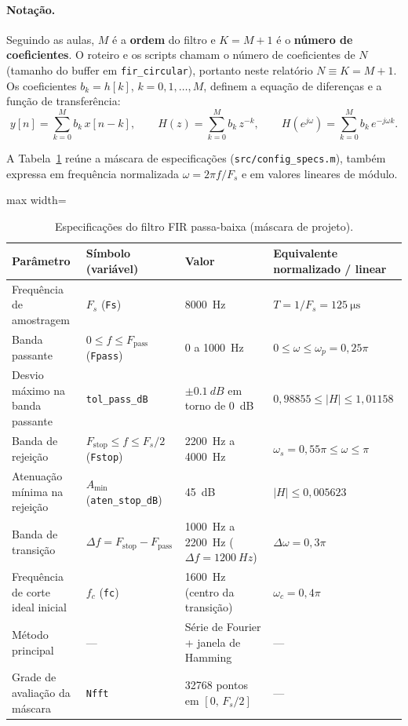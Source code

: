 \documentclass[11pt,a4paper]{article}
\begin{document}
\paragraph{Notação.} Seguindo as aulas, $M$ é a \textbf{ordem} do filtro e $K = M + 1$ é o \textbf{número de coeficientes}. O roteiro e os scripts chamam o número de coeficientes de $N$ (tamanho do buffer em \texttt{fir\_circular}), portanto neste relatório $N \equiv K = M + 1$. Os coeficientes $b_k = h[k]$, $k = 0, 1, \dots, M$, definem a equação de diferenças e a função de transferência:
\begin{equation}
    y[n] = \sum_{k=0}^{M} b_k\, x[n-k], \qquad H(z) = \sum_{k=0}^{M} b_k\, z^{-k}, \qquad H(e^{j\omega}) = \sum_{k=0}^{M} b_k\, e^{-j\omega k}.
    \label{eq:fir}
\end{equation}

A Tabela~\ref{tab:especificacoes} reúne a máscara de especificações (\texttt{src/config\_specs.m}), também expressa em frequência normalizada $\omega = 2\pi f / F_s$ e em valores lineares de módulo.

\begin{table}[H]
    \centering
    \caption{Especificações do filtro FIR passa-baixa (máscara de projeto).}
    \label{tab:especificacoes}
    \small
    \begin{adjustbox}{max width=\textwidth}
    \begin{tabular}{@{}llll@{}}
        \toprule
        \textbf{Parâmetro} & \textbf{Símbolo (variável)} & \textbf{Valor} & \textbf{Equivalente normalizado / linear} \\
        \midrule
        Frequência de amostragem & $F_s$ (\texttt{Fs}) & \SI{8000}{Hz} & $T = 1/F_s = \SI{125}{\micro\second}$ \\
        Banda passante & $0 \le f \le F_{\text{pass}}$ (\texttt{Fpass}) & 0 a \SI{1000}{Hz} & $0 \le \omega \le \omega_p = 0,25\pi$ \\
        Desvio máximo na banda passante & \texttt{tol\_pass\_dB} & $\pm\SI{0,1}{dB}$ em torno de \SI{0}{dB} & $0,98855 \le |H| \le 1,01158$ \\
        Banda de rejeição & $F_{\text{stop}} \le f \le F_s/2$ (\texttt{Fstop}) & \SI{2200}{Hz} a \SI{4000}{Hz} & $\omega_s = 0,55\pi \le \omega \le \pi$ \\
        Atenuação mínima na rejeição & $A_{\min}$ (\texttt{aten\_stop\_dB}) & \SI{45}{dB} & $|H| \le 0,005623$ \\
        Banda de transição & $\Delta f = F_{\text{stop}} - F_{\text{pass}}$ & \SI{1000}{Hz} a \SI{2200}{Hz} ($\Delta f = \SI{1200}{Hz}$) & $\Delta\omega = 0,3\pi$ \\
        Frequência de corte ideal inicial & $f_c$ (\texttt{fc}) & \SI{1600}{Hz} (centro da transição) & $\omega_c = 0,4\pi$ \\
        Método principal & --- & Série de Fourier + janela de Hamming & --- \\
        Grade de avaliação da máscara & \texttt{Nfft} & \num{32768} pontos em $[0,\, F_s/2]$ & --- \\
        \bottomrule
    \end{tabular}
    \end{adjustbox}
\end{table}
\end{document}
